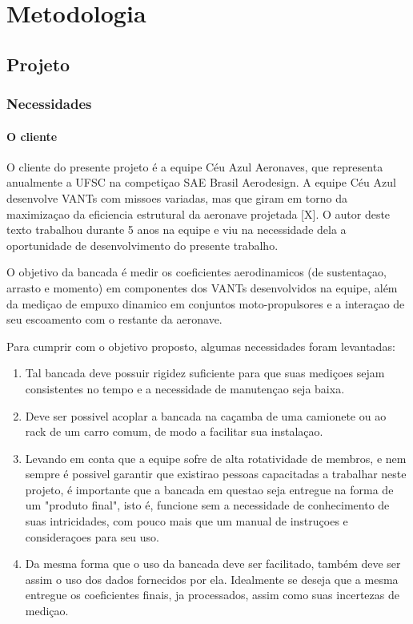\chapter{Metodologia}\label{chp:met}

\section{Projeto}

\subsection{Necessidades}

\subsubsection{O cliente}
O cliente do presente projeto é a equipe Céu Azul Aeronaves, que representa anualmente a UFSC na competiçao SAE Brasil Aerodesign. A equipe Céu Azul desenvolve VANTs com missoes variadas, mas que giram em torno da maximizaçao da eficiencia estrutural da aeronave projetada [X]. O autor deste texto trabalhou durante 5 anos na equipe e viu na necessidade dela a oportunidade de desenvolvimento do presente trabalho.

O objetivo da bancada é medir os coeficientes aerodinamicos (de sustentaçao, arrasto e momento) em componentes dos VANTs desenvolvidos na equipe, além da mediçao de empuxo dinamico em conjuntos moto-propulsores e a interaçao de seu escoamento com o restante da aeronave.

Para cumprir com o objetivo proposto, algumas necessidades foram levantadas:

\begin{enumerate}
    \item Tal bancada deve possuir rigidez suficiente para que suas mediçoes sejam consistentes no tempo e a necessidade de manutençao seja baixa.
    \item Deve ser possivel acoplar a bancada na caçamba de uma camionete ou ao rack de um carro comum, de modo a facilitar sua instalaçao.
    \item Levando em conta que a equipe sofre de alta rotatividade de membros, e nem sempre é possivel garantir que existirao pessoas capacitadas a trabalhar neste projeto, é importante que a bancada em questao seja entregue na forma de um "produto final", isto é, funcione sem a necessidade de conhecimento de suas intricidades, com pouco mais que um manual de instruçoes e consideraçoes para seu uso.
    \item Da mesma forma que o uso da bancada deve ser facilitado, também deve ser assim o uso dos dados fornecidos por ela. Idealmente se deseja que a mesma entregue os coeficientes finais, ja processados, assim como suas incertezas de mediçao.
\end{enumerate}


